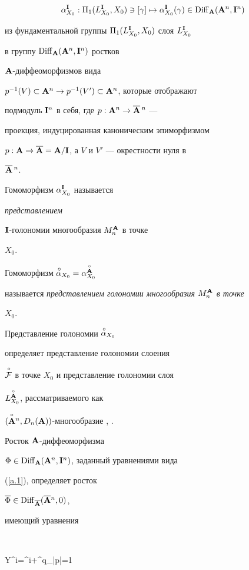 $$


\alpha^\I_{X_0}:\Pi_1(L^\I_{X_0},X_0)\ni [\gamma]\mapsto


\alpha^\I_{X_0}(\gamma)


\in\Diff_\A (\A^n,\I^n)


$$


из фундаментальной группы $\Pi_1(L^{\bold I}_{X_0},X_0)$ слоя $L^{\bold I}_{X_0}$


в группу $\operatorname{Diff}_{\bold A}({\bold A}^n,{\bold I}^n)$ ростков


${\bold A}$-диф\-фе\-о\-мор\-физмов вида


$p^{-1}(V)\subset{\bold A}^n\to p^{-1}(V')\subset{\bold A}^n$, которые отображают


подмодуль ${\bold I}^n$ в себя, где $p:{\bold A}^n\to\overline{{\bold A}}{}\,^n$ ---


проекция, индуцированная каноническим эпиморфизмом


$p:{\bold A}\to\overline{{\bold A}}={\bold A}/{\bold I}$, а $V$ и $V'$ --- окрестности нуля в


$\overline{{\bold A}}{}\,^n$.


Гомоморфизм $\alpha^{\bold I}_{X_0}$ называется {\it представлением


${\bold I}$-голономии многообразия $M^{\bold A}_n$ в точке} $X_0$.


Гомоморфизм ${\overset{\,\circ}{\alpha}{}}_{X_0}=\alpha^{\overset{\circ}{\bold A}{}}_{X_0}$


называется {\it представлением голономии многообразия $M^{\bold A}_n$ в точке}


$X_0$.


Представление голономии ${\overset{\,\circ}{\alpha}{}}_{X_0}$


определяет представление голономии слоения


$\overset{\,\circ}{\cal F}{}$ в точке $X_0$ и представление голономии слоя


$L^{\overset{\circ}{\bold A}{}}_{X_0}$, рассматриваемого как


$(\overset{\circ}{{\bold A}}{}^n,D_n({\bold A}))$-многообразие \cite{VSh3}, \cite{VSh4}.


 


Росток ${\bold A}$-диффеоморфизма


$\Phi\in\operatorname{Diff}_{\bold A}({\bold A}^n,{\bold I}^n)$, заданный уравнениями вида


(\ref{a.1}), определяет росток


$\overline\Phi\in\operatorname{Diff}_{\overline{{\bold A}}}(\overline{{\bold A}}{}{}^n,0)$,


имеющий уравнения


$$


{\overline Y}{}^{i}=\overline\varphi{}^{i}+\sum^q_{|p|=1}


